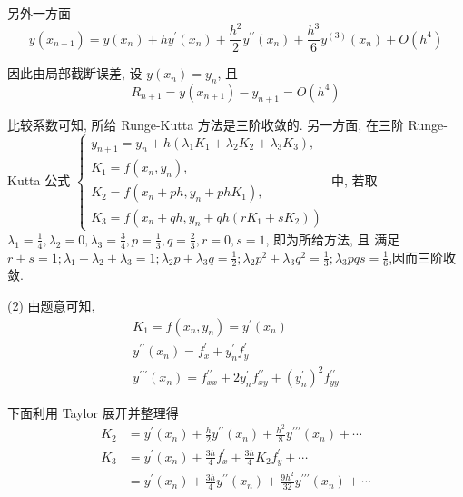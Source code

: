 \begin{tcolorbox}[enhanced,colback=8,colframe=7,breakable,coltitle=green!25!black,title=2024]
另外一方面
$$
y\left(x_{n+1}\right)=y\left(x_{n}\right)+h y^{\prime}\left(x_{n}\right)+\frac{h^{2}}{2} y^{\prime \prime}\left(x_{n}\right)+\frac{h^{3}}{6} y^{(3)}\left(x_{n}\right)+O\left(h^{4}\right)
$$

因此由局部截断误差, 设 $ y\left(x_{n}\right)=y_{n} $, 且
$$
R_{n+1}=y\left(x_{n+1}\right)-y_{n+1}=O\left(h^{4}\right)
$$

比较系数可知, 所给 Runge-Kutta 方法是三阶收敛的.
另一方面, 在三阶 Runge-Kutta 公式 $ \left\{\begin{array}{l}y_{n+1}=y_{n}+h\left(\lambda_{1} K_{1}+\lambda_{2} K_{2}+\lambda_{3} K_{3}\right), \\ K_{1}=f\left(x_{n}, y_{n}\right), \\ K_{2}=f\left(x_{n}+p h, y_{n}+p h K_{1}\right), \\ K_{3}=f\left(x_{n}+q h, y_{n}+q h\left(r K_{1}+s K_{2}\right)\right)\end{array}\right. $
中, 若取 $ \lambda_{1}=\frac{1}{4}, \lambda_{2}=0, \lambda_{3}=\frac{3}{4}, p=\frac{1}{3}, q=\frac{2}{3}, r=0, s=1 $, 即为所给方法, 且
满足 $ r+s=1 ; \lambda_{1}+\lambda_{2}+\lambda_{3}=1 ; \lambda_{2} p+\lambda_{3} q=\frac{1}{2} ; \lambda_{2} p^{2}+\lambda_{3} q^{2}=\frac{1}{3} ; \lambda_{3} p q s=\frac{1}{6} $,因而三阶收敛.

(2) 由题意可知,
$$
\begin{array}{c}
K_{1}=f\left(x_{n}, y_{n}\right)=y^{\prime}\left(x_{n}\right) \\
y^{\prime \prime}\left(x_{n}\right)=f_{x}^{\prime}+y_{n}^{\prime} f_{y}^{\prime} \\
y^{\prime \prime \prime}\left(x_{n}\right)=f_{x x}^{\prime \prime}+2 y_{n}^{\prime} f_{x y}^{\prime \prime}+\left(y_{n}^{\prime}\right)^{2} f_{y y}^{\prime \prime}
\end{array}
$$

下面利用 Taylor 展开并整理得
$$
\begin{aligned}
K_{2} & =y^{\prime}\left(x_{n}\right)+\frac{h}{2} y^{\prime \prime}\left(x_{n}\right)+\frac{h^{2}}{8} y^{\prime \prime \prime}\left(x_{n}\right)+\cdots \\
K_{3} & =y^{\prime}\left(x_{n}\right)+\frac{3 h}{4} f_{x}^{\prime}+\frac{3 h}{4} K_{2} f_{y}^{\prime}+\cdots \\
& =y^{\prime}\left(x_{n}\right)+\frac{3 h}{4} y^{\prime \prime}\left(x_{n}\right)+\frac{9 h^{2}}{32} y^{\prime \prime \prime}\left(x_{n}\right)+\cdots
\end{aligned}
$$


\end{tcolorbox}
